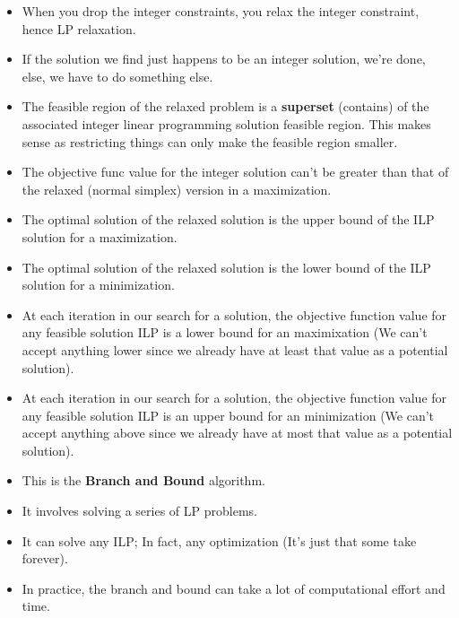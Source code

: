 \documentclass[12pt, a4paper]{article}
\begin{document}
\begin{itemize}
    \item When you drop the integer constraints, you relax the integer constraint, hence LP relaxation.
    \item If the solution we find just happens to be an integer solution, we're done, else, we have to do something else.
    \item The feasible region of the relaxed problem is a \textbf{superset} (contains) of the associated integer linear programming solution feasible region. This makes sense as restricting things can only make the feasible region smaller.
    \item The objective func value for the integer solution can't be greater than that of the relaxed (normal simplex) version in a maximization.
    \item The optimal solution of the relaxed solution is the upper bound of the ILP solution for a maximization.
    \item The optimal solution of the relaxed solution is the lower bound of the ILP solution for a minimization.
    \item At each iteration in our search for a solution, the objective function value for any feasible solution ILP is a lower bound for an maximixation (We can't accept anything lower since we already have at least that value as a potential solution).
    \item At each iteration in our search for a solution, the objective function value for any feasible solution ILP is an upper bound for an minimization (We can't accept anything above since we already have at most that value as a potential solution).
    \item This is the \textbf{Branch and Bound} algorithm.
    \item It involves solving a series of LP problems.
    \item It can solve any ILP; In fact, any optimization (It's just that some take forever).
    \item In practice, the branch and bound can take a lot of computational effort and time.
\end{itemize}
\pagebreak
\end{document}
